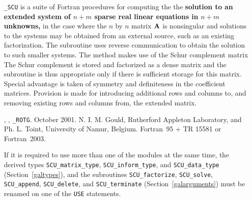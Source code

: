 \documentclass{galahad}
\newcommand{\packagename}{SCU}
\newcommand{\fullpackagename}{\libraryname\-\_\-\packagename}
\begin{document}
\galheader


\galsummary

{\tt \fullpackagename} is a suite of Fortran procedures for 
computing the 
the {\bf solution to an extended system of $n + m$ 
sparse real linear equations in $n  +  m$ unknowns,} 
in the case where the $n$ by $n$ matrix ${\mathbf{A}}$ is nonsingular 
and solutions to the systems 
may be obtained from an external source, such as an existing 
factorization.  The subroutine uses reverse communication to obtain 
the solution to such smaller systems.  The method makes use of 
the Schur complement matrix 
The Schur complement is stored and factorized as a dense matrix 
and the subroutine is thus appropriate only if there is 
sufficient storage for this matrix. Special advantage is taken 
of symmetry and definiteness in the coefficient matrices. 
Provision is made for introducing additional rows and columns 
to, and removing existing rows and columns from, the extended 
matrix. 
 

\galattributes
\galversions{\tt  \fullpackagename\_single, \fullpackagename\_double},
, {\tt \_ROTG}. 
\galdate October 2001.
\galorigin N. I. M. Gould, Rutherford Appleton Laboratory, and
Ph. L. Toint, University of Namur, Belgium.
\gallanguage Fortran~95 + TR 15581 or Fortran~2003. 


\galhowto



\noindent
If it is required to use more than one of the modules at the same time, 
the derived types
{\tt \packagename\_matrix\_type}, 
{\tt \packagename\_inform\_type}, and
{\tt \packagename\_data\_type} 
(Section~\ref{galtypes}),
and the subroutines
{\tt \packagename\_factorize},  
{\tt \packagename\_solve},  
{\tt \packagename\_append},  
{\tt \packagename\_delete}, 
and 
{\tt \packagename\_terminate} 
(Section~\ref{galarguments})
must be renamed on one of the {\tt USE} statements.
\end{document}
